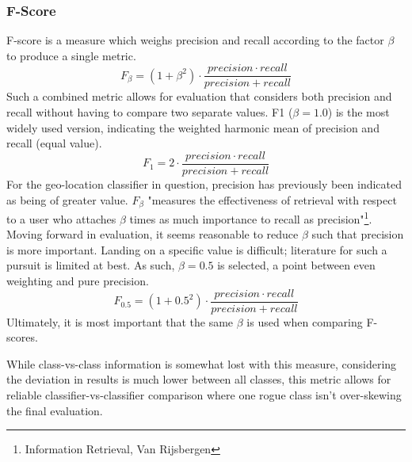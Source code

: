 \documentclass[twocolumn]{article}
\begin{document}
\subsubsection{F-Score}
F-score is a measure which weighs precision and recall according to the factor $\beta$ to produce a single metric.
\begin{equation}
F_\beta = (1+\beta ^2) \cdot \frac{precision \cdot recall}{precision + recall}
\end{equation}
Such a combined metric allows for evaluation that considers both precision and recall without having to compare two separate values. F1 ($\beta = 1.0$) is the most widely used version, indicating the weighted harmonic mean of precision and recall (equal value).
\begin{equation}
F_1 = 2 \cdot \frac{precision \cdot recall}{precision + recall}
\end{equation}
For the geo-location classifier in question, precision has previously been indicated as being of greater value. $F_\beta$ "measures the effectiveness of retrieval with respect to a user who attaches $\beta$ times as much importance to recall as precision"\footnote{\cite{vanrijsbergenc.j.1979} Information Retrieval, Van Rijsbergen}. Moving forward in evaluation, it seems reasonable to reduce $\beta$ such that precision is more important. Landing on a specific value is difficult; literature for such a pursuit is limited at best. As such, $\beta = 0.5$ is selected, a point between even weighting and pure precision.
\begin{equation}
F_{0.5} = (1+0.5^2) \cdot \frac{precision \cdot recall}{precision + recall}
\end{equation}
Ultimately, it is most important that the same $\beta$ is used when comparing F-scores.

While class-vs-class information is somewhat lost with this measure, considering the deviation in results is much lower between all classes, this metric allows for reliable classifier-vs-classifier comparison where one rogue class isn't over-skewing the final evaluation.
\end{document}
